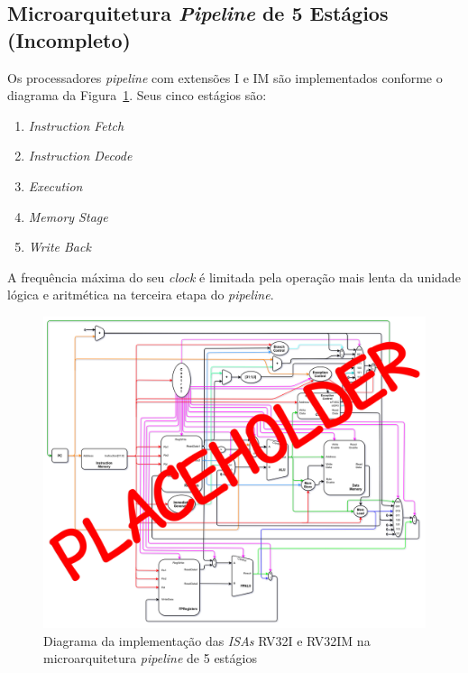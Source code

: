     \subsection{Microarquitetura \textit{Pipeline} de 5 Estágios (Incompleto)}
        { Os processadores \textit{pipeline} com extensões I e IM são
            implementados conforme o diagrama da Figura~\ref{fig:diagram_rv32i_pipe}.
            Seus cinco estágios são:
            \begin{enumerate}
                \item \textit{Instruction Fetch}
                \item \textit{Instruction Decode}
                \item \textit{Execution}
                \item \textit{Memory Stage}
                \item \textit{Write Back}
            \end{enumerate}
        }
        { A frequência máxima do seu \textit{clock} é limitada pela operação
            mais lenta da unidade lógica e aritmética na terceira etapa do
            \textit{pipeline}.
        }

        \begin{figure}[H]
        \centering
            \includegraphics[width=.9\linewidth]{../images/uarch_diagrams/pipeline-RV32I-RV32IM.png}
            \caption{Diagrama da implementação das \textit{ISAs} RV32I e RV32IM na
            microarquitetura \textit{pipeline} de 5 estágios}\label{fig:diagram_rv32i_pipe}
        \end{figure}

